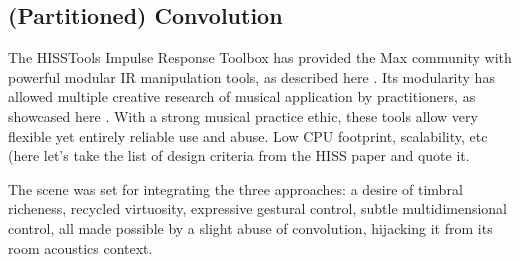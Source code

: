 
\subsection{(Partitioned) Convolution}

The HISSTools Impulse Response Toolbox has provided the Max community with powerful modular IR manipulation tools, as described here \cite{HarkerTremblay-icmc2012-hisstools}. Its modularity has allowed multiple creative research of musical application by practitioners, as showcased here \cite{HarkerTremblay-forum2013-rethinking-the-box}. With a strong musical practice ethic, these tools allow very flexible yet entirely reliable use and abuse. Low CPU footprint, scalability, etc (here let's take the list of design criteria from the HISS paper and quote it.

The scene was set for integrating the three approaches: a desire of timbral richeness, recycled virtuosity, expressive gestural control, subtle multidimensional control, all made possible by a slight abuse of convolution, hijacking it from its room acoustics context.
